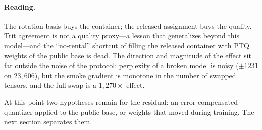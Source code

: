 \paragraph{Reading.}
The rotation basis buys the container; the released assignment buys the
quality. Trit agreement is not a quality proxy---a lesson that generalizes
beyond this model---and the ``no-rental'' shortcut of filling the released
container with PTQ weights of the public base is dead. The direction and
magnitude of the effect sit far outside the noise of the protocol: perplexity
of a broken model is noisy ($\pm 1231$ on $23{,}606$), but the smoke gradient
is monotone in the number of swapped tensors, and the full swap is a
$1{,}270\times$ effect.

At this point two hypotheses remain for the residual: an error-compensated
quantizer applied to the public base, or weights that moved during training.
The next section separates them.
